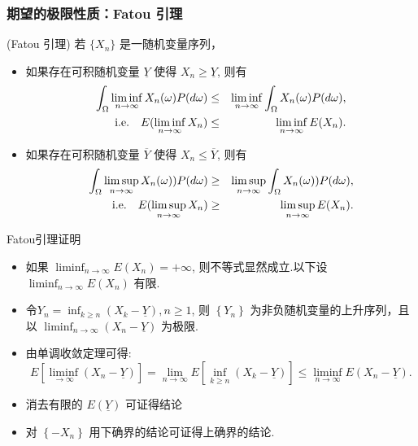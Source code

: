 	\begin{frame}
		\frametitle{期望的极限性质：Fatou 引理}
		\begin{thm}
			(Fatou 引理) 若 $\{X_n\}$ 是一随机变量序列，
			\begin{itemize}
				\item 如果存在可积随机变量 $\underline{Y}$ 使得 $X_n\geq \underline{Y}$, 则有 \begin{eqnarray*}
					\int_{\Omega}\liminf_{n\rightarrow\infty}X_n(\omega)P(d\omega)&\leq& \liminf_{n\rightarrow\infty}\int_\Omega X_n(\omega)P(d\omega),  \\
					{\rm i.e. }\quad  E(\liminf_{n\rightarrow\infty}X_n)&\leq& \liminf_{n\rightarrow\infty}E(X_n).                                                                                           \end{eqnarray*}
				\item 如果存在可积随机变量 $\overline{Y}$ 使得 $X_n\leq \overline{Y}$, 则有 \begin{eqnarray*}                                                                                                          \int_{\Omega}\limsup_{n\rightarrow\infty} X_n (\omega)) P (d\omega)&\geq& \limsup_{n\rightarrow\infty}\int_\Omega X_n (\omega)) P (d\omega), \\
					{\rm i.e.} \quad    E(\limsup_{n\rightarrow\infty}X_n)&\geq& \limsup_{n\rightarrow\infty}E(X_n).                                                                                           \end{eqnarray*} \end{itemize}
		\end{thm}

	\end{frame}
\begin{frame}{Fatou引理证明}
	\begin{itemize}[<+-|alert@+>]
		\item 如果 $\liminf_{n\rightarrow\infty}E\left(X_n\right)=+\infty$, 则不等式显然成立.以下设 $\liminf_{n\rightarrow\infty}E\left(X_n\right)$ 有限.
		\item 令$Y_{n}=\inf_{k\geq n}\left(X_{k}-\underline{Y}\right),  n \geq 1$,	则 $\left\{Y_{n}\right\}$ 为非负随机变量的上升序列，且以 $\liminf_{n\rightarrow\infty}\left(X_n-\underline{Y}\right)$ 为极限.
		\item 由单调收敛定理可得: %
		\[
		E\left[\liminf_{\rightarrow\infty}\left(X_n-\underline{Y}\right)\right]=\lim_{n\rightarrow\infty} E\left[\inf_{k\geq n}\left(X_{k}-\underline{Y}\right)\right] \leq \liminf_{n\rightarrow\infty}E\left(X_n-\underline{Y}\right) .
		\]
		\item 消去有限的 $E(\underline{Y})$ 可证得结论
		\item 对 $\left\{-X_n\right\}$ 用下确界的结论可证得上确界的结论.%
	\end{itemize}

\end{frame}


